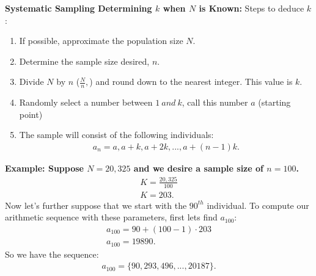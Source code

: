 \documentclass{report}
\begin{document}
        \pagebreak \bigbreak \noindent
        \textbf{Systematic Sampling Determining $k$ when $N$ is Known:}
        \bigbreak \noindent 
        Steps to deduce $k$:
        \begin{enumerate}
            \item If possible, approximate the population size $N$. 
            \item Determine the sample size desired, $n$. 
            \item Divide $N$ by $n$ \bigg($\frac{N}{n},$\bigg) and round down to the nearest integer. This value is $k$.
            \item Randomly select a number between $1\ and\ k$, call this number $a$ (starting point)
            \item The sample will consist of the following individuals:
                \begin{align*}
                    a_{n} = a, a + k, a +2k,..., a + (n-1)k
                .\end{align*}
        \end{enumerate}
        \bigbreak \noindent 
        \begin{mdframed}
          \textbf{Example: Suppose $N=20,325$ and we desire a sample size of $n=100$. }
          \bigbreak \noindent 
          \begin{align*}
              K= \frac{20,325}{100} \\
              K= 203
          .\end{align*}
          \bigbreak \noindent 
          Now let's further suppose that we start with the $90^{th}$ individual. 
          \bigbreak \noindent 
          To compute our arithmetic sequence with these parameters, first lets find $a_{100}$:
          \begin{align*}
              a_{100} = 90 + (100-1)\cdot 203 \\
              a_{100} = 19890
          .\end{align*}
          \bigbreak \noindent 
          So we have the sequence:
          \begin{align*}
              a_{100} = \{90, 293, 496,...,20187\}
          .\end{align*}
        \end{mdframed}
\end{document}
